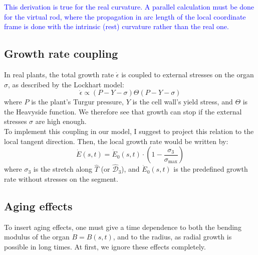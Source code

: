 \documentclass[a4paper, 11pt]{article}
\begin{document}
\noindent \textcolor{blue}{This derivation is true for the real curvature. A parallel calculation must be done for the virtual rod, where the propagation in arc length of the local coordinate frame is done with the intrinsic (rest) curvature rather than the real one.}




\newpage

\subsection*{Growth rate coupling}
In real plants, the total growth rate $\dot{\epsilon}$ is coupled to external stresses on the organ $\sigma$, as described by the Lockhart model:
\begin{equation}
    \dot{\epsilon}\propto (P-Y-\sigma) \Theta (P-Y-\sigma)
\end{equation}
where $P$ is the plant's Turgur pressure, $Y$ is the cell wall's yield stress, and $\Theta$ is the Heavyside function. 
We therefore see that growth can stop if the external stresses $\sigma$ are high enough. \\
To implement this coupling in our model, I suggest to project this relation to the local tangent direction.  Then, the local growth rate would be written by:
\begin{equation}
    \dot{E}(s,t)=\dot{E}_0(s,t)\cdot\left(1-\frac{\sigma_3}{\sigma_{\text{max}}}\right)
\end{equation}
where $\sigma_3$ is the stretch along $\hat{T}$ (or $\hat{\mathcal{D}}_3$), and $\dot{E}_0(s,t)$ is the predefined growth rate without stresses on the segment.\\
\subsection*{Aging effects}
To insert aging effects, one must give a time dependence to both the bending modulus of the organ $B=B(s,t)$, and to the radius, as radial growth is possible in long times. At first, we ignore these effects completely.
\end{document}

